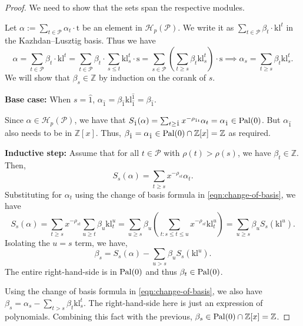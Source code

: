 \documentclass[12pt,letterpaper,english]{amsart}
\theoremstyle{teoremas}
\theoremstyle{definition}
\newcommand{\cH}{\mathcal{H}}
\newcommand{\calP}{\mathcal{P}}
\newcommand{\ZZ}{\mathbb{Z}}
\newcommand{\Ebasis}[1]{\mathrm{#1}}
\newcommand{\klbasis}[1]{\mathrm{kl}^{#1}}
\newcommand{\klbasisSub}[2]{\mathrm{kl}^{#1}_{#2}}
\newcommand{\pal}{\normalfont\text{Pal}}
\begin{document}
\begin{proof}
    We need to show that the sets span the respective modules.

    Let \(\alpha:=\sum_{t\in\calP}{\alpha_t\cdot\Ebasis{t}}\) be an element in \(\cH_p(\calP)\).
    We write it as
    \(\sum_{t\in\calP}{\beta_t\cdot\klbasis{t}}\) in the Kazhdan--Lusztig basis.
    Thus we have
    \begin{equation}\label{eqn:change-of-basis}
        \alpha = \sum_{t\in\calP}{\beta_t\cdot\klbasis{t}}
        =\sum_{t\in\calP}{\beta_t\cdot\sum_{s\leq t}{\klbasisSub{t}{s}\cdot\Ebasis{s}}}
        =\sum_{s\in\calP}{\left(\sum_{t\geq s}{\beta_{t}\klbasisSub{t}{s}}\right)\cdot\Ebasis{s}}
        \implies\alpha_{s}=\sum_{t\geq s}{\beta_{t}\klbasisSub{t}{s}}.
    \end{equation}
    We will show that \(\beta_s\in\ZZ\) by induction on the corank of \(s\).

    \noindent\textbf{Base case:} When \(s=\hat{1}\),
    \(\alpha_{\hat{1}}=\beta_{\hat{1}}\klbasisSub{\hat{1}}
    {\hat{1}}=\beta_{\hat{1}}\).

    Since \(\alpha\in\cH_p(\calP)\),
    we have that \(S_{\hat{1}}(\alpha) = \sum_{t\geq \hat{1}}
    {x^{-\rho_{\hat{1}t}}\alpha_{t} = \alpha_{\hat{1}}}\in\pal(0)\). But \(\alpha_{\hat{1}}\)
    also needs to be in \(\ZZ[x]\). Thus, \(\beta_{\hat{1}}=\alpha_{\hat{1}}\in\pal(0)\cap\ZZ[x] = \ZZ\)
    as required.

    \noindent\textbf{Inductive step:} Assume that for all \(t\in\calP\) with \(\rho(t)>\rho(s)\),
    we have \(\beta_t\in\ZZ\). Then,
    \[S_s(\alpha)=\sum_{t\geq s}{x^{-\rho_{st}}\alpha_{t}}.\]
    Substituting for \(\alpha_t\) using the change of basis formula in \ref{eqn:change-of-basis},
    we have
    \[S_s(\alpha)=\sum_{t\geq s}{x^{-\rho_{st}}\sum_{u\geq t}{\beta_{u}\klbasisSub{u}{t}}}
        =\sum_{u\geq s}{\beta_{u}\left(\sum_{t:s\leq t\leq u}{x^{-\rho_{st}}\klbasisSub{u}{t}}\right)}
        =\sum_{u\geq s}{\beta_{u}S_s(\klbasis{u})}.\]
    Isolating the \(u=s\) term, we have,
    \[\beta_{s} = S_s(\alpha) - \sum_{u> s}{\beta_{u}S_s(\klbasis{u})}.\]
    The entire right-hand-side is in \(\pal(0)\) and thus \(\beta_{t}\in\pal(0)\).


    \noindent Using the change of basis formula in \ref{eqn:change-of-basis}, we also have
    \(\beta_{s}=\alpha_s-\sum_{t>s}{\beta_{t}\klbasisSub{t}{s}}.\)
    The right-hand-side here is just an expression of polynomials. Combining this fact with the previous,
    \(\beta_s\in\pal(0)\cap\ZZ[x]=\ZZ\).


\end{proof}
\end{document}
